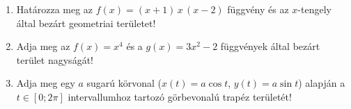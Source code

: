 \documentclass[a4paper, 12pt]{scrartcl}
\begin{document}
\begin{enumerate}
  \item Határozza meg az $f(x) = (x + 1) \, x \, (x - 2)$ függvény és az $x$-tengely
        által bezárt geometriai területet!

  \item Adja meg az $f(x) = x^4$ és a $g(x) = 3x^2 - 2$ függvények által bezárt
        terület nagyságát!

  \item Adja meg egy $a$ sugarú körvonal ($x(t) = a \cos t$, $y(t) = a \sin t$)
        alapján a $t \in [0; 2\pi]$ intervallumhoz tartozó görbevonalú trapéz
        területét!
\end{enumerate}

\end{document}
